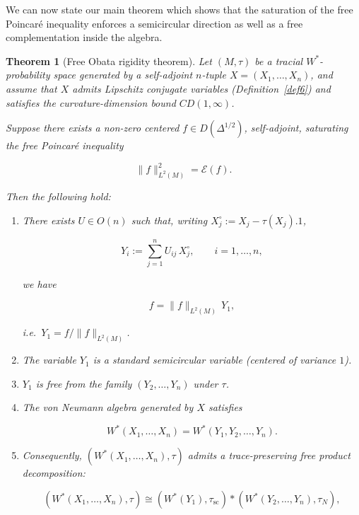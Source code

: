 \documentclass[10pt,a4paper,reqno]{amsart}
\newtheorem{theorem}{Theorem}[section]
\begin{document}
\begin{flushleft}
We can now state our main theorem which shows that the saturation of the free Poincaré inequality enforces a semicircular direction as well as a free complementation inside the algebra.     
\end{flushleft}

\begin{theorem}[Free Obata rigidity theorem]\label{thm:free-product-lipschitz}
Let $(M,\tau)$ be a tracial $W^\ast$-probability space generated by a self-adjoint
$n$-tuple $X=(X_1,\ldots,X_n)$, and assume that $X$ admits Lipschitz conjugate
variables (Definition~\ref{def6}) and satisfies the curvature-dimension bound
$CD(1,\infty)$.

Suppose there exists a non-zero centered $f\in D(\Delta^{1/2})$, self-adjoint,
saturating the free Poincaré inequality


\[
  \|f\|_{L^2(M)}^2=\mathcal{E}(f).
\]



Then the following hold:

\begin{enumerate}

  \item There exists $U\in O(n)$ such that, writing $X_j^\circ:=X_j-\tau(X_j).1$,
  

\[
      Y_i:=\sum_{j=1}^n U_{ij}\,X_j^\circ,\qquad i=1,\ldots,n,
  \]


  we have
  

\[
      f=\|f\|_{L^2(M)}\,Y_1,
  \]


  i.e.\ $Y_1 = f/\|f\|_{L^2(M)}$.

  \item The variable $Y_1$ is a standard semicircular variable (centered of variance $1$).

  \item $Y_1$ is free from the family $(Y_2,\ldots,Y_n)$ under $\tau$.

  \item The von Neumann algebra generated by $X$ satisfies
  

\[
      W^\ast(X_1,\ldots,X_n)=W^\ast(Y_1,Y_2,\ldots,Y_n).
  \]



  \item Consequently, $(W^\ast(X_1,\ldots,X_n),\tau)$ admits a trace-preserving
  free product decomposition:
  

\[
      (W^\ast(X_1,\ldots,X_n),\tau)
      \cong
      (W^\ast(Y_1),\tau_{\mathrm{sc}})
      *
      (W^\ast(Y_2,\ldots,Y_n),\tau_N),
  \]



\end{enumerate}
\end{theorem}
\end{document}
